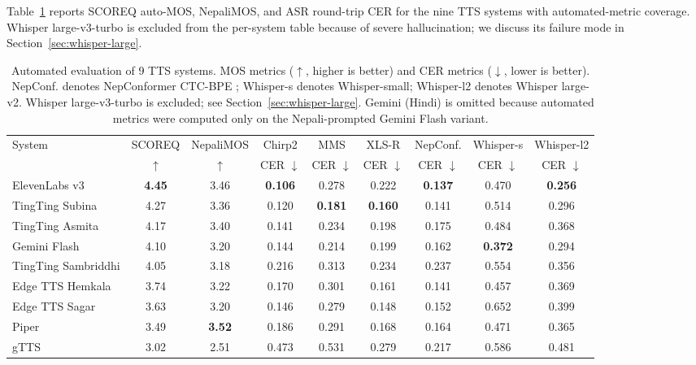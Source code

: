 \documentclass[11pt]{article}
\begin{document}
Table~\ref{tab:auto_metrics} reports SCOREQ auto-MOS, NepaliMOS, and ASR round-trip CER for the nine TTS systems with automated-metric coverage. Whisper large-v3-turbo is excluded from the per-system table because of severe hallucination; we discuss its failure mode in Section~\ref{sec:whisper-large}.

\begin{table}[t]
\centering
\caption{Automated evaluation of 9 TTS systems. MOS metrics ($\uparrow$, higher is better) and CER metrics ($\downarrow$, lower is better). NepConf. denotes NepConformer CTC-BPE \citep{poudel2026nepconformer}; Whisper-s denotes Whisper-small; Whisper-l2 denotes Whisper large-v2. Whisper large-v3-turbo is excluded; see Section~\ref{sec:whisper-large}. Gemini (Hindi) is omitted because automated metrics were computed only on the Nepali-prompted Gemini Flash variant.}
\label{tab:auto_metrics}
\footnotesize
\setlength{\tabcolsep}{2pt}
\begin{tabular}{lcccccccc}
\toprule
System & SCOREQ & NepaliMOS & Chirp2 & MMS & XLS-R & NepConf. & Whisper-s & Whisper-l2 \\
 & $\uparrow$ & $\uparrow$ & CER $\downarrow$ & CER $\downarrow$ & CER $\downarrow$ & CER $\downarrow$ & CER $\downarrow$ & CER $\downarrow$ \\
\midrule
ElevenLabs v3 & \textbf{4.45} & 3.46 & \textbf{0.106} & 0.278 & 0.222 & \textbf{0.137} & 0.470 & \textbf{0.256} \\
TingTing Subina & 4.27 & 3.36 & 0.120 & \textbf{0.181} & \textbf{0.160} & 0.141 & 0.514 & 0.296 \\
TingTing Asmita & 4.17 & 3.40 & 0.141 & 0.234 & 0.198 & 0.175 & 0.484 & 0.368 \\
Gemini Flash & 4.10 & 3.20 & 0.144 & 0.214 & 0.199 & 0.162 & \textbf{0.372} & 0.294 \\
TingTing Sambriddhi & 4.05 & 3.18 & 0.216 & 0.313 & 0.234 & 0.237 & 0.554 & 0.356 \\
Edge TTS Hemkala & 3.74 & 3.22 & 0.170 & 0.301 & 0.161 & 0.141 & 0.457 & 0.369 \\
Edge TTS Sagar & 3.63 & 3.20 & 0.146 & 0.279 & 0.148 & 0.152 & 0.652 & 0.399 \\
Piper & 3.49 & \textbf{3.52} & 0.186 & 0.291 & 0.168 & 0.164 & 0.471 & 0.365 \\
gTTS & 3.02 & 2.51 & 0.473 & 0.531 & 0.279 & 0.217 & 0.586 & 0.481 \\
\bottomrule
\end{tabular}
\end{table}
\end{document}
